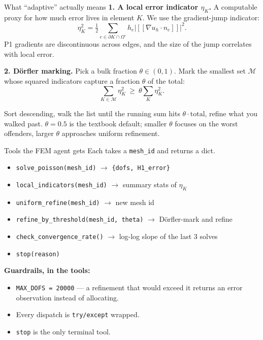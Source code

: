 \documentclass[aspectratio=169,10pt]{beamer}
\newcommand{\code}[1]{\texttt{\small #1}}
\begin{document}
\begin{frame}{What ``adaptive'' actually means}
\textbf{1. A local error indicator $\eta_K$.} A computable proxy for how much
error lives in element $K$. We use the gradient-jump indicator:
$$\eta_K^2 = \tfrac{1}{2}\sum_{e \in \partial K \cap \Omega^\circ}
   h_e \big| [\![ \nabla u_h \cdot n_e ]\!] \big|^2.$$
P1 gradients are discontinuous across edges, and the size of the jump
correlates with local error.

\vspace{0.8em}
\textbf{2. Dörfler marking.} Pick a bulk fraction $\theta \in (0,1)$. Mark the
smallest set $\mathcal{M}$ whose squared indicators capture a fraction $\theta$
of the total:
$$\sum_{K \in \mathcal{M}} \eta_K^2 \ \geq\ \theta \sum_K \eta_K^2.$$

\vspace{0.3em}
{\small Sort descending, walk the list until the running sum hits
$\theta \cdot \text{total}$, refine what you walked past. $\theta = 0.5$ is the
textbook default; smaller $\theta$ focuses on the worst offenders, larger
$\theta$ approaches uniform refinement.}
\end{frame}

\begin{frame}[fragile]{Tools the FEM agent gets}
Each takes a \code{mesh\_id} and returns a dict.

\vspace{0.5em}
\begin{itemize}\itemsep3pt
  \item \code{solve\_poisson(mesh\_id)} $\to$ \code{\{dofs, H1\_error\}}
  \item \code{local\_indicators(mesh\_id)} $\to$ summary stats of $\eta_K$
  \item \code{uniform\_refine(mesh\_id)} $\to$ new mesh id
  \item \code{refine\_by\_threshold(mesh\_id, theta)} $\to$ Dörfler-mark and refine
  \item \code{check\_convergence\_rate()} $\to$ log-log slope of the last 3 solves
  \item \code{stop(reason)}
\end{itemize}

\vspace{1em}
\textbf{Guardrails, in the tools:}
\begin{itemize}\itemsep2pt
  \item \code{MAX\_DOFS = 20000} --- a refinement that would exceed it returns an
        error observation instead of allocating.
  \item Every dispatch is \code{try/except} wrapped.
  \item \code{stop} is the only terminal tool.
\end{itemize}
\end{frame}
\end{document}
